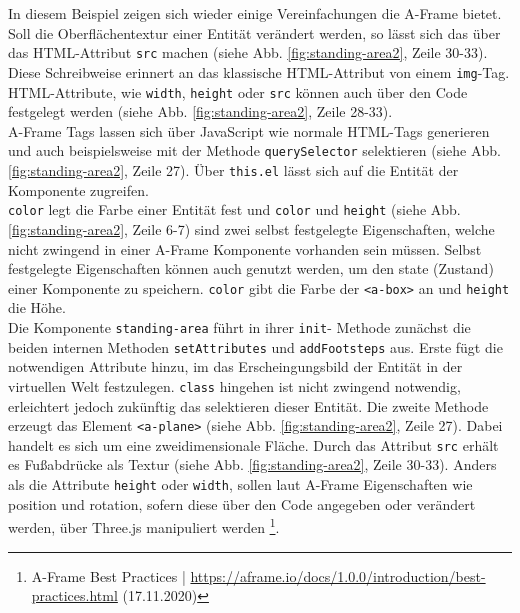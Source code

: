\documentclass[a4paper,12pt,oneside]{article}
\begin{document}
        In diesem Beispiel zeigen sich wieder einige Vereinfachungen
        die A-Frame bietet. Soll die Oberflächentextur einer
        Entität verändert werden, so lässt sich das über das HTML-Attribut
        \texttt{src} machen
        (siehe Abb. \ref{fig:standing-area2}, Zeile 30-33). 
        Diese Schreibweise erinnert an das klassische
        HTML-Attribut von einem \texttt{img}-Tag.
        HTML-Attribute, wie \texttt{width},
        \texttt{height} oder \texttt{src} können auch über den Code
        festgelegt werden 
        (siehe Abb. \ref{fig:standing-area2}, Zeile 28-33). \\
        A-Frame Tags lassen sich über JavaScript wie normale HTML-Tags
        generieren und auch beispielsweise mit der Methode \texttt{querySelector}
        selektieren
        (siehe Abb. \ref{fig:standing-area2}, Zeile 27). Über \texttt{this.el}
        lässt sich auf die Entität der Komponente zugreifen. \\
        \texttt{color} legt die Farbe
        einer Entität fest und
        \texttt{color} und \texttt{height} 
        (siehe Abb. \ref{fig:standing-area2}, Zeile 6-7)
        sind zwei selbst festgelegte
        Eigenschaften, welche nicht zwingend in einer A-Frame Komponente
        vorhanden sein müssen. Selbst festgelegte Eigenschaften können
        auch genutzt werden, um den state (Zustand) einer Komponente
        zu speichern. \texttt{color} gibt die Farbe der \texttt{<a-box>}
        an und \texttt{height} die Höhe. \\
        Die Komponente \texttt{standing-area} führt in ihrer \texttt{init}-
        Methode zunächst die beiden internen Methoden \texttt{setAttributes}
        und \texttt{addFootsteps} aus. Erste fügt die notwendigen
        Attribute hinzu, im das Erscheingungsbild der Entität in der
        virtuellen Welt festzulegen. \texttt{class} hingehen ist nicht
        zwingend notwendig, erleichtert jedoch zukünftig das selektieren
        dieser Entität. Die zweite Methode erzeugt das Element 
        \texttt{<a-plane>}
        (siehe Abb. \ref{fig:standing-area2}, Zeile 27). 
        Dabei handelt es sich um eine zweidimensionale
        Fläche. Durch das Attribut \texttt{src} erhält es Fußabdrücke
        als Textur (siehe Abb. \ref{fig:standing-area2}, Zeile 30-33).
        Anders als die Attribute \texttt{height} oder \texttt{width},
        sollen laut A-Frame Eigenschaften wie position und rotation,
        sofern diese über den Code angegeben oder verändert werden,
        über Three.js manipuliert werden
        \footnote{A-Frame Best Practices | \url{https://aframe.io/docs/1.0.0/introduction/best-practices.html} (17.11.2020)}.
\end{document}
